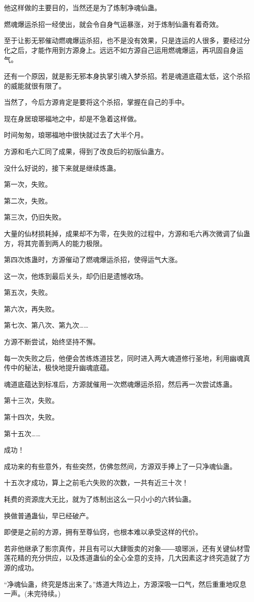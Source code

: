 \begin{this_body}
他这样做的主要目的，当然还是为了炼制净魂仙蛊。

燃魂爆运杀招一经使出，就会令自身气运暴涨，对于炼制仙蛊有着奇效。

至于让影无邪催动燃魂爆运杀招，也不是没有效果，只是连运的人很多，要经过分化之后，才能作用到方源身上。远远不如方源自己运用燃魂爆运，再巩固自身运气。

还有一个原因，就是影无邪本身执掌引魂入梦杀招。若是魂道底蕴太低，这个杀招的威能就很有限了。

当然了，今后方源肯定是要将这个杀招，掌握在自己的手中。

现在身居琅琊福地之中，却是不急着这样做。

时间匆匆，琅琊福地中很快就过去了大半个月。

方源和毛六汇同了成果，得到了改良后的初版仙蛊方。

没什么好说的，接下来就是继续炼蛊。

第一次，失败。

第二次，失败。

第三次，仍旧失败。

大量的仙材损耗掉，成果却不为零，在失败的过程中，方源和毛六再次微调了仙蛊方，将其完善到两人的能力极限。

第四次炼蛊时，方源催动了燃魂爆运杀招，使得运气大涨。

这一次，他炼到最后关头，却仍旧是遗憾收场。

第五次，失败。

第六次，再失败。

第七次、第八次、第九次……

方源不断尝试，始终坚持不懈。

每一次失败之后，他便会苦练炼道技艺，同时进入两大魂道修行圣地，利用幽魂真传中的秘法，极快地提升幽魂底蕴。

魂道底蕴达到标准后，方源就催用一次燃魂爆运杀招，然后再一次尝试炼蛊。

第十三次，失败。

第十四次，失败。

第十五次……

成功！

成功来的有些意外，有些突然，仿佛忽然间，方源双手捧上了一只净魂仙蛊。

十五次才成功，算上之前毛六失败的次数，一共有近三十次！

耗费的资源庞大无比，就为了炼制出这么一只小小的六转仙蛊。

换做普通蛊仙，早已经破产。

即便是之前的方源，拥有至尊仙窍，也根本难以承受这样的代价。

若非他继承了影宗真传，并且有可以大肆贩卖的对象――琅琊派，还有关键仙材雪莲花精的充分供应，以及炼道蛊仙的全心全意的支持，几大因素这才终究造就了方源的成功。

“净魂仙蛊，终究是炼出来了。”炼道大阵边上，方源深吸一口气，然后重重地叹息一声。(未完待续。)

\end{this_body}

